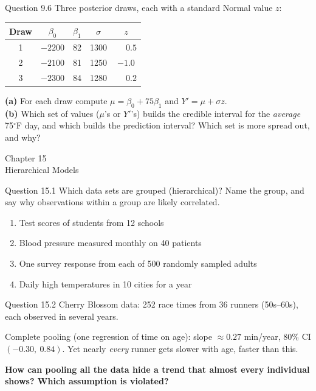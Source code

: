 \documentclass[aspectratio=43,11pt]{beamer}
\newcommand{\divider}[2]{%
  \begin{frame}
    \centering
    {\Large #1}\\[0.6em]
    {\normalsize #2}
  \end{frame}}
\begin{document}
\begin{frame}{Question 9.6}
  Three posterior draws, each with a standard Normal value $z$:
  \vspace{0.3em}
  \begin{center}
  \begin{tabular}{@{}ccccc@{}}
    \toprule
    Draw & $\beta_0$ & $\beta_1$ & $\sigma$ & $z$ \\
    \midrule
    1 & $-2200$ & 82 & 1300 & $\phantom{-}0.5$ \\
    2 & $-2100$ & 81 & 1250 & $-1.0$ \\
    3 & $-2300$ & 84 & 1280 & $\phantom{-}0.2$ \\
    \bottomrule
  \end{tabular}
  \end{center}
  \textbf{(a)} For each draw compute $\mu = \beta_0 + 75\beta_1$ and
  $Y' = \mu + \sigma z$. \\[0.3em]
  \textbf{(b)} Which set of values ($\mu$'s or $Y'$'s) builds the credible
  interval for the \emph{average} 75$^\circ$F day, and which builds the
  prediction interval? Which set is more spread out, and why?
\end{frame}

\divider{Chapter 15}{Hierarchical Models}

\begin{frame}{Question 15.1}
  Which data sets are grouped (hierarchical)? Name the group, and say
  why observations within a group are likely correlated.
  \vspace{0.6em}
  \begin{enumerate}
    \item Test scores of students from 12 schools
    \item Blood pressure measured monthly on 40 patients
    \item One survey response from each of 500 randomly sampled adults
    \item Daily high temperatures in 10 cities for a year
  \end{enumerate}
\end{frame}

\begin{frame}{Question 15.2}
  Cherry Blossom data: 252 race times from 36 runners (50s--60s), each
  observed in several years.
  \vspace{0.3em}

  Complete pooling (one regression of time on age): slope $\approx 0.27$
  min/year, 80\% CI $(-0.30,\ 0.84)$. Yet nearly \emph{every} runner gets
  slower with age, faster than this.
  \vspace{0.6em}

  \textbf{How can pooling all the data hide a trend that almost every
  individual shows? Which assumption is violated?}
\end{frame}
\end{document}
